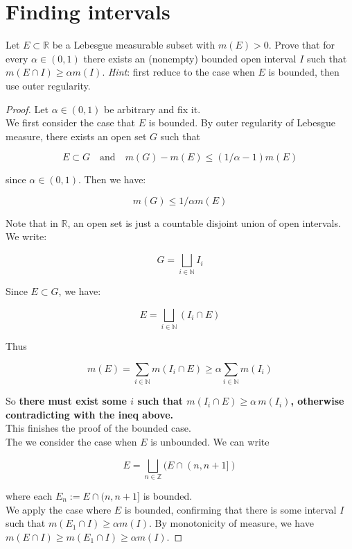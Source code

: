 \documentclass{qlnotes-export}
\begin{document}
\section{Finding intervals}\label{finding-intervals}

Let \(E \subset {\mathbb{R}}\) be a Lebesgue measurable subset with \(m(E) > 0\). Prove that for every \(\alpha \in (0,1)\) there exists an (nonempty) bounded open interval \(I\) such that \(m(E \cap I) \geq \alpha m(I)\). \emph{Hint}: first reduce to the case when \(E\) is bounded, then use outer regularity.

\begin{proof}

Let \(\alpha \in (0,1)\) be arbitrary and fix it.\\
We first consider the case that \(E\) is bounded. By outer regularity of Lebesgue measure, there exists an open set \(G\) such that

\[E \subset G\quad\text{and}\quad m(G) - m(E) \leq (1/\alpha - 1) m(E)\]

since \(\alpha \in (0,1)\). Then we have:

\[m(G) \leq 1/\alpha m(E)\]

Note that in \(\mathbb{R}\), an open set is just a countable disjoint union of open intervals. We write:

\[G = \bigsqcup\limits_{i \in {\mathbb{N}}}I_{i}\]

Since \(E \subset G\), we have:

\[E = \bigsqcup\limits_{i \in {\mathbb{N}}}(I_{i} \cap E)\]

Thus

\[m(E) = \sum\limits_{i \in {\mathbb{N}}}m(I_{i} \cap E) \geq \alpha\sum\limits_{i \in {\mathbb{N}}}m(I_{i})\]

So \textbf{there must exist some \(i\) such that \(m(I_{i} \cap E) \geq \alpha\, m(I_{i})\), otherwise contradicting with the ineq above.}\\
This finishes the proof of the bounded case.\\
The we consider the case when \(E\) is unbounded. We can write

\[E = \bigsqcup\limits_{n \in {\mathbb{Z}}}(E \cap (n,n + 1\rbrack)\]

where each \(E_{n} := E \cap (n,n + 1\rbrack\) is bounded.\\
We apply the case where \(E\) is bounded, confirming that there is some interval \(I\) such that \(m(E_{1} \cap I) \geq \alpha m(I)\). By monotonicity of measure, we have \(m(E \cap I) \geq m(E_{1} \cap I) \geq \alpha m(I)\).

\end{proof}
\end{document}
